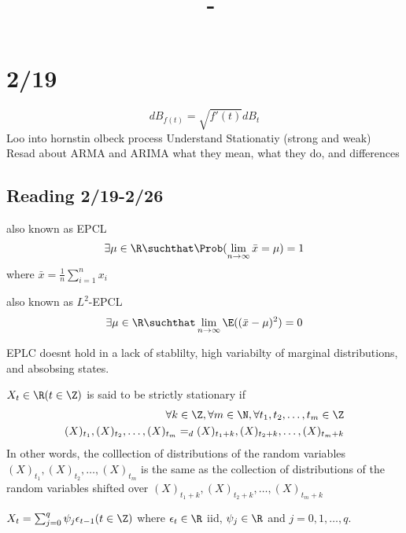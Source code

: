 \documentclass[answers,12pt,addpoints]{exam}
\author{\name}
\title{\course \ - \assignment}
\begin{document}
\maketitle


\newpage
\section{2/19}
$$ d B_{f(t)} = \sqrt{f'(t)} dB_t $$
Loo into hornstin olbeck process
Understand Stationatiy (strong and weak)
Resad about ARMA and ARIMA what they mean, what they do, and differences
\subsection{Reading 2/19-2/26}
\begin{definition}
    also known as EPCL
    $$ \exists \mu \in \R \suchthat \Prob( \lim_{n \to \infty} \bar{x} = \mu) = 1 $$
    where $\bar{x} = \frac{1}{n} \sum_{i=1}^n x_i$
\end{definition}
\begin{definition}
    also known as $L^2$-EPCL
    $$ \exists \mu \in \R \suchthat \lim_{n \to \infty} \E((\bar{x} - \mu)^2) = 0 $$
\end{definition}
EPLC doesnt hold in a lack of stablilty, high variabilty of marginal distributions, and absobsing states.\\
\begin{definition}
    $X_t \in \R (t \in \Z)$ is said to be strictly stationary if 
    \begin{align*}
        \forall k \in \Z, \forall m \in \N, \forall t_1, t_2, \ldots, t_m \in \Z\\
        (X)_{t_1}, (X)_{t_2}, \ldots, (X)_{t_m} =_d (X)_{t_1 + k}, (X)_{t_2 + k}, \ldots, (X)_{t_m + k}
    \end{align*}
    In other words, the colllection of distributions of the random variables $(X)_{t_1}, (X)_{t_2}, \ldots, (X)_{t_m}$ is the same as the collection of distributions of the random variables shifted over $(X)_{t_1 + k}, (X)_{t_2 + k}, \ldots, (X)_{t_m + k}$
    \begin{example}
        $X_t = \sum_{j=0}^{q} \psi_j \epsilon_{t-1} (t \in \Z)$
        where $\epsilon_t \in \R$ iid, $\psi_j \in \R$ and $j = 0, 1, \ldots, q$.
    \end{example}
\end{definition}
\end{document}
